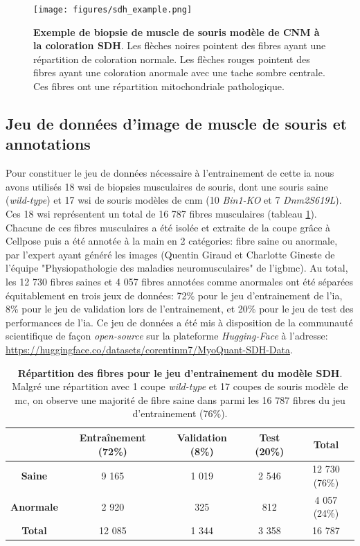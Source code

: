 \begin{figure}[!ht]
 \centering
 \texttt{[image: figures/sdh\_example.png]}
 \caption[Exemple de biopsie musculaire à la coloration SDH]{\textbf{Exemple de biopsie de muscle de souris modèle de CNM à la coloration SDH}. Les flèches noires pointent des fibres ayant une répartition de coloration normale. Les flèches rouges pointent des fibres ayant une coloration anormale avec une tache sombre centrale. Ces fibres ont une répartition mitochondriale pathologique.}
 \label{fig:sdh_example}
\end{figure}
\subsection{Jeu de données d'image de muscle de souris et annotations}
Pour constituer le jeu de données nécessaire à l'entrainement de cette \gls{ia} nous avons utilisés 18 \gls{wsi} de biopsies musculaires de souris, dont une souris saine (\textit{wild-type}) et 17 \gls{wsi} de souris modèles de \gls{cnm} (10 \textit{Bin1-KO} et 7 \textit{Dnm2S619L}). Ces 18 \gls{wsi} représentent un total de 16 787 fibres musculaires (tableau \ref{tab:sdh_fiber_count}). Chacune de ces fibres musculaires a été isolée et extraite de la coupe grâce à Cellpose puis a été annotée à la main en 2 catégories: fibre saine ou anormale, par l'expert ayant généré les images (Quentin Giraud et Charlotte Gineste de l'équipe "Physiopathologie des maladies neuromusculaires" de l'\gls{igbmc}). Au total, les 12 730 fibres saines et 4 057 fibres annotées comme anormales ont été séparées équitablement en trois jeux de données: 72\% pour le jeu d'entrainement de l'\gls{ia}, 8\% pour le jeu de validation lors de l'entrainement, et 20\% pour le jeu de test des performances de l'\gls{ia}. Ce jeu de données a été mis à disposition de la communauté scientifique de façon \textit{open-source} sur la plateforme \textit{Hugging-Face} à l'adresse: \href{https://huggingface.co/datasets/corentinm7/MyoQuant-SDH-Data}{https://huggingface.co/datasets/corentinm7/MyoQuant-SDH-Data}.

\begin{table}[!ht]
\centering
\caption[Répartition des fibres pour le jeu d'entrainement du modèle SDH]{\textbf{Répartition des fibres pour le jeu d'entrainement du modèle SDH}. Malgré une répartition avec 1 coupe \textit{wild-type} et 17 coupes de souris modèle de \gls{mc}, on observe une majorité de fibre saine dans parmi les 16 787 fibres du jeu d'entrainement (76\%).}
\label{tab:sdh_fiber_count}
\begin{tabular}{|c|c|c|c|c|}
\hline
 & \textbf{Entraînement} (72\%) & \textbf{Validation} (8\%) & \textbf{Test} (20\%) & \textbf{Total} \\
\hline
\textbf{Saine} & 9 165 & 1 019 & 2 546 & 12 730 (76\%) \\
\hline
\textbf{Anormale} & 2 920 & 325 & 812 & 4 057 (24\%) \\
\hline
\hline
\textbf{Total} & 12 085 & 1 344 & 3 358 & 16 787 \\
\hline
\end{tabular}
\end{table}


